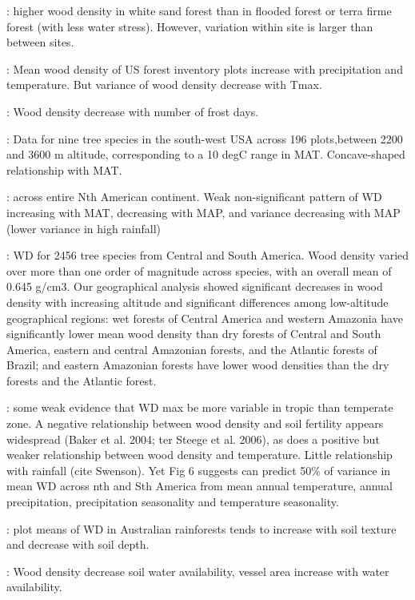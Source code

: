 \documentclass[a4paper,11pt]{article}
\begin{document}
\citet{Fortunel-2014}: higher wood density in white sand forest than in flooded forest or terra firme forest (with less water stress). However, variation within site is larger than between sites.

\citet{Swenson-2010}: Mean wood density of US forest inventory plots increase with precipitation and temperature. But variance of wood density decrease with Tmax.

\citet{VanBodegom-2014}: Wood density decrease with number of frost days. 

\citet{Laughlin-2012}: Data for nine tree species in the south-west USA across 196 plots,between 2200 and 3600 m altitude, corresponding to a 10 degC range in MAT. Concave-shaped relationship with MAT.

\citet{Simova-2014}: across entire Nth American continent. Weak non-significant pattern of WD increasing with MAT, decreasing with MAP, and variance decreasing with MAP (lower variance in high rainfall)

\citet{Chave-2006}: WD for 2456 tree species from Central and South America. Wood density varied over more than one order of magnitude across species, with an overall mean of 0.645 g/cm3. Our geographical analysis showed significant decreases in wood density with increasing altitude and significant differences among low-altitude geographical regions: wet forests of Central America and western Amazonia have significantly lower mean wood density than dry forests of Central and South America, eastern and central Amazonian forests, and the Atlantic forests of Brazil; and eastern Amazonian forests have lower wood densities than the dry forests and the Atlantic forest.

\citet{Chave-2009}: some weak evidence that WD max be more variable in tropic than temperate zone. A negative relationship between wood density and soil fertility appears widespread (Baker et al. 2004; ter Steege et al. 2006), as does a positive but weaker relationship between wood density and temperature. Little relationship with rainfall (cite Swenson). Yet Fig 6 suggests can predict 50\% of variance in mean WD across nth and Sth America from mean annual temperature, annual precipitation, precipitation seasonality and temperature seasonality.

\citet{Kooyman-2010}: plot means of WD in Australian rainforests tends to increase with soil texture and decrease with soil depth.

\citet{Preston-2010}: Wood density decrease soil water availability, vessel area increase with water availability.
\end{document}
